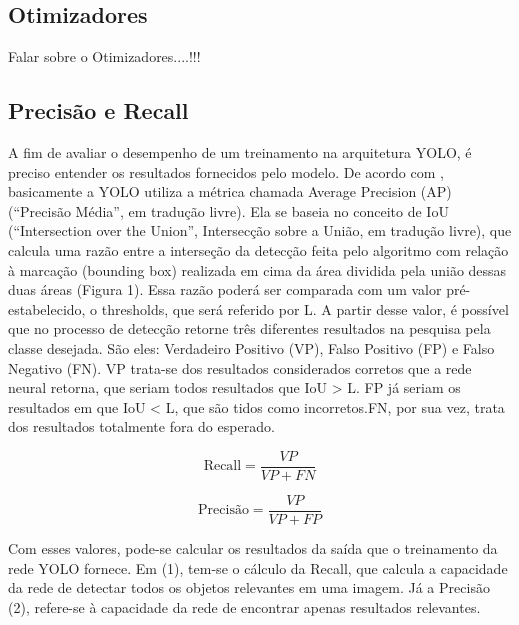 \subsection{Otimizadores}
\label{sec:otimizadores}

Falar sobre o Otimizadores....!!!

\subsection{Precisão e Recall}
\label{sec:precisaorecall}

A fim de avaliar o desempenho de um treinamento na arquitetura YOLO, é preciso entender os resultados fornecidos pelo modelo. De acordo com \cite{padilla2020survey}, basicamente a YOLO utiliza a métrica chamada Average Precision (AP) (“Precisão Média”, em tradução livre). Ela se baseia no conceito de IoU (“Intersection over the Union”, Intersecção sobre a União, em tradução livre), que calcula uma razão entre a interseção da detecção feita pelo algoritmo com relação à marcação (bounding box) realizada em cima da área dividida pela união dessas duas áreas (Figura 1). Essa razão poderá ser comparada com um valor pré-estabelecido, o thresholds, que será referido por L. A partir desse valor, é possível que no processo de detecção retorne três diferentes resultados na pesquisa pela classe desejada. São eles: Verdadeiro Positivo (VP), Falso Positivo (FP) e Falso Negativo (FN). VP trata-se dos resultados considerados corretos que a rede neural retorna, que seriam todos resultados que IoU > L. FP já seriam os resultados em que IoU < L, que são tidos como incorretos.FN, por sua vez, trata dos resultados totalmente fora do esperado.

\begin{equation}
    \text{Recall} = \frac{VP}{VP + FN} \tag{1}
\end{equation}
    
\begin{equation}
    \text{Precisão} = \frac{VP}{VP + FP} \tag{2}
\end{equation}

Com esses valores, pode-se calcular os resultados da saída que o treinamento da rede YOLO fornece. Em (1), tem-se o cálculo da Recall, que calcula a capacidade da rede de detectar todos os objetos relevantes em uma imagem. Já a Precisão (2), refere-se à capacidade da rede de encontrar apenas resultados relevantes. 

